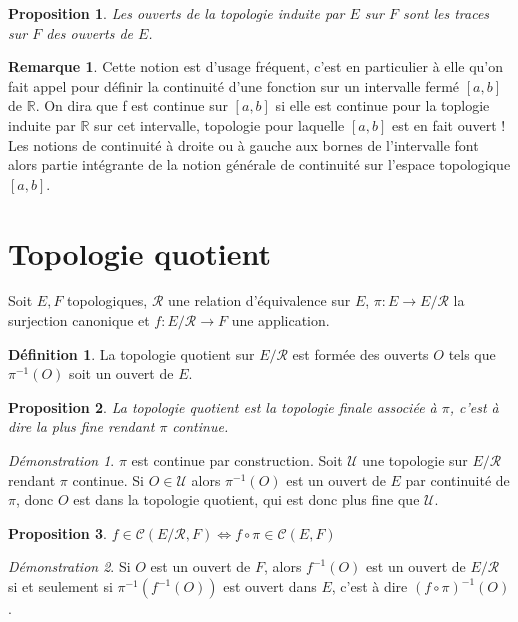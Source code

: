 \documentclass[a4paper, 11pt, french]{book}
\theoremstyle{plain} %
\newtheorem{proposition}{Proposition}
\theoremstyle{definition} %
\newtheorem{definition}{Définition}
\newtheorem{remarque}{Remarque}
\theoremstyle{remark} %
\newtheorem*{demonstration}{Démonstration}
\newcommand{\1}{\mathds{1}}
\newcommand{\cont}{\mathcal{C}}
\newcommand{\inv}[1]{#1^{-1}}
\newcommand{\R}{\mathbb{R}}
\begin{document}
\begin{proposition}
	Les ouverts de la topologie induite par $E$ sur $F$ sont les traces sur $F$ des ouverts de $E$.
\end{proposition}

\begin{remarque}
	Cette notion est d’usage fréquent, c’est en particulier à elle qu’on fait appel pour définir la continuité d’une fonction sur un intervalle fermé $[a, b]$ de $\R$.
	On dira que f est continue sur $[a, b]$ si elle est continue pour la toplogie induite par $\R$ sur cet intervalle, topologie pour laquelle $[a, b]$ est en fait ouvert !
	Les notions de continuité à droite ou à gauche aux bornes de l’intervalle font alors partie intégrante de la notion générale de continuité sur l’espace topologique $[a, b]$.
\end{remarque}

\section{Topologie quotient}
Soit $E, F$ topologiques, $\mathcal{R}$ une relation d’équivalence sur $E$, $\pi\colon E\rightarrow E/\mathcal{R}$ la surjection canonique et $f\colon E/\mathcal{R}\rightarrow F$ une application.

\begin{definition}
	La topologie quotient sur $E/\mathcal{R}$ est formée des ouverts $O$ tels que $\inv{\pi}(O)$ soit un ouvert de $E$.
\end{definition}

\begin{proposition}
	La topologie quotient est la topologie finale associée à $\pi$, c'est à dire la plus fine rendant $\pi$ continue.
\end{proposition}

\begin{demonstration}
	$\pi$ est continue par construction.
	Soit $\mathscr{U}$ une topologie sur $E/\mathcal{R}$ rendant $\pi$ continue.
	Si $O\in\mathscr{U}$ alors $\inv{\pi}(O)$ est un ouvert de $E$ par continuité de $\pi$, donc $O$ est dans la topologie quotient, qui est donc plus fine que $\mathscr{U}$.
\end{demonstration}

\begin{proposition}
	$f\in\cont(E/\mathcal{R}, F)\iff f\circ\pi\in\cont(E, F)$
\end{proposition}

\begin{demonstration}
	Si $O$ est un ouvert de $F$, alors $\inv{f}(O)$ est un ouvert de $E/\mathcal{R}$ si et seulement si $\inv{\pi}(\inv{f}(O))$ est ouvert dans $E$, c'est à dire $\inv{(f\circ\pi)}(O)$.
\end{demonstration}
\end{document}
